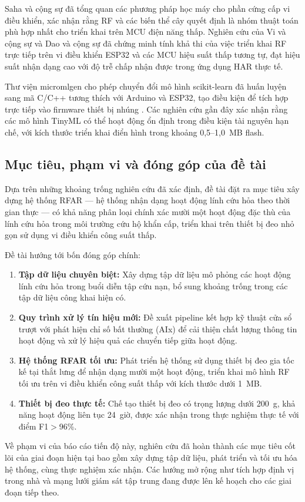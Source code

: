 Saha và cộng sự \cite{MLforMicrocontroller2022} đã tổng quan các phương pháp học máy cho phần cứng cấp vi điều khiển, xác nhận rằng RF và các biến thể cây quyết định là nhóm thuật toán phù hợp nhất cho triển khai trên MCU điện năng thấp. Nghiên cứu của Vi và cộng sự \cite{ViManhTuyen2024} và Dao và cộng sự \cite{DaoHieu2022} đã chứng minh tính khả thi của việc triển khai RF trực tiếp trên vi điều khiển ESP32 và các MCU hiệu suất thấp tương tự, đạt hiệu suất nhận dạng cao với độ trễ chấp nhận được trong ứng dụng HAR thực tế.

Thư viện micromlgen cho phép chuyển đổi mô hình scikit-learn đã huấn luyện sang mã C/C++ tương thích với Arduino và ESP32, tạo điều kiện để tích hợp trực tiếp vào firmware thiết bị nhúng \cite{Tiny_machine_on_microcontroller}. Các nghiên cứu gần đây \cite{TinyMLOnEmbedded2025, RIOT_tinyML2025} xác nhận rằng các mô hình TinyML có thể hoạt động ổn định trong điều kiện tài nguyên hạn chế, với kích thước triển khai điển hình trong khoảng 0,5--1,0~MB flash.

\subsection{Mục tiêu, phạm vi và đóng góp của đề tài}

Dựa trên những khoảng trống nghiên cứu đã xác định, đề tài đặt ra mục tiêu xây dựng hệ thống RFAR --- hệ thống nhận dạng hoạt động lính cứu hỏa theo thời gian thực --- có khả năng phân loại chính xác mười một hoạt động đặc thù của lính cứu hỏa trong môi trường cứu hộ khẩn cấp, triển khai trên thiết bị đeo nhỏ gọn sử dụng vi điều khiển công suất thấp.

Đề tài hướng tới bốn đóng góp chính:

\begin{enumerate}[leftmargin=1.5cm, label=(\arabic*)]
    \item \textbf{Tập dữ liệu chuyên biệt:} Xây dựng tập dữ liệu mô phỏng các hoạt động lính cứu hỏa trong buổi diễn tập cứu nạn, bổ sung khoảng trống trong các tập dữ liệu công khai hiện có.
    \item \textbf{Quy trình xử lý tín hiệu mới:} Đề xuất pipeline kết hợp kỹ thuật cửa sổ trượt với phát hiện chỉ số bất thường (AIx) để cải thiện chất lượng thông tin hoạt động và xử lý hiệu quả các chuyển tiếp giữa hoạt động.
    \item \textbf{Hệ thống RFAR tối ưu:} Phát triển hệ thống sử dụng thiết bị đeo gia tốc kế tại thắt lưng để nhận dạng mười một hoạt động, triển khai mô hình RF tối ưu trên vi điều khiển công suất thấp với kích thước dưới 1~MB.
    \item \textbf{Thiết bị đeo thực tế:} Chế tạo thiết bị đeo có trọng lượng dưới 200~g, khả năng hoạt động liên tục 24~giờ, được xác nhận trong thực nghiệm thực tế với điểm F1$>$96\%.
\end{enumerate}

Về phạm vi của báo cáo tiến độ này, nghiên cứu đã hoàn thành các mục tiêu cốt lõi của giai đoạn hiện tại bao gồm xây dựng tập dữ liệu, phát triển và tối ưu hóa hệ thống, cùng thực nghiệm xác nhận. Các hướng mở rộng như tích hợp định vị trong nhà và mạng lưới giám sát tập trung đang được lên kế hoạch cho các giai đoạn tiếp theo.
